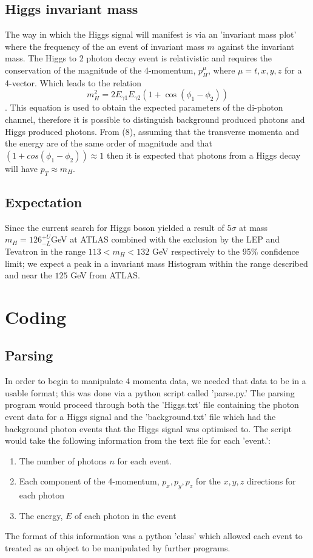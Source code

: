 \documentclass{article}
\begin{document}
\subsection{Higgs invariant mass}
The way in which the Higgs signal will manifest is via an 'invariant mass plot' where the frequency of the an event of invariant mass $m$ against the invariant mass. 
The Higgs to 2 photon decay event is relativistic and requires the conservation of the magnitude of the 4-momentum, $p_H^\mu$, where $\mu = t, x, y, z$ for a 4-vector. Which leads to the relation
\begin{equation}
m_H^2 = 2 E_{\gamma 1} E_{\gamma 2} (1 + \cos(\phi_1 - \phi_2)) 
\end{equation}.
This equation is used to obtain the expected parameters of the di-photon channel, therefore it is possible to distinguish background produced photons and Higgs produced photons. 
From (8), assuming that the transverse momenta and the energy are of the same order of magnitude and that $(1 + cos(\phi_1 - \phi_2)) \approx 1$ then it is expected that photons from a Higgs decay will have $p_T \approx m_H$.
\subsection{Expectation}
Since the current search for Higgs boson yielded a result of $5\sigma$ at mass $m_H = 126^{+ U}_{-L}$GeV at ATLAS combined with the exclusion by the LEP and Tevatron in the range $113 < m_H < 132$ GeV respectively to the 95\% confidence limit; we expect a peak in a invariant mass Histogram within the range described and near the $125$ GeV from ATLAS.
\section{Coding}
\subsection{Parsing}
In order to begin to manipulate 4 momenta data, we needed that data to be in a usable format; this was done via a python script called 'parse.py.' The parsing program would proceed through both the 'Higgs.txt' file containing the photon event data for a Higgs signal and the 'background.txt' file which had the background photon events that the Higgs signal was optimised to. The script would take the following information from the text file for each 'event.':
\begin{enumerate}
\item The number of photons $n$ for each event.
\item Each component of the 4-momentum, $p_x, p_y, p_z$ for the $x, y, z$ directions for each photon
\item The energy, $E$ of each photon in the event
\end{enumerate}
The format of this information was a python 'class' which allowed each event to treated as an object to be manipulated by further programs.
\end{document}
